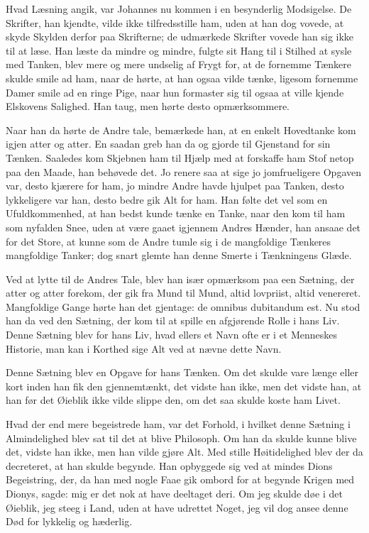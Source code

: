 \documentclass[12pt,a4paper]{article}
\begin{document}
Hvad Læsning angik, var Johannes nu kommen i en besynderlig Modsigelse. De Skrifter, han kjendte, vilde ikke tilfredsstille ham, uden at han dog vovede, at skyde Skylden derfor paa Skrifterne; de udmærkede Skrifter vovede han sig ikke til at læse. Han læste da mindre og mindre, fulgte sit Hang til i Stilhed at sysle med Tanken, blev mere og mere undselig af Frygt for, at de fornemme Tænkere skulde smile ad ham, naar de hørte, at han ogsaa vilde tænke, ligesom fornemme Damer smile ad en ringe Pige, naar hun formaster sig til ogsaa at ville kjende Elskovens Salighed. Han taug, men hørte desto opmærksommere.

Naar han da hørte de Andre tale, bemærkede han, at en enkelt Hovedtanke kom igjen atter og atter. En saadan greb han da og gjorde til Gjenstand for sin Tænken. Saaledes kom Skjebnen ham til Hjælp med at forskaffe ham Stof netop paa den Maade, han behøvede det. Jo renere saa at sige jo jomfrueligere Opgaven var, desto kjærere for ham, jo mindre Andre havde hjulpet paa Tanken, desto lykkeligere var han, desto bedre gik Alt for ham. Han følte det vel som en Ufuldkommenhed, at han bedst kunde tænke en Tanke, naar den kom til ham som nyfalden Snee, uden at være gaaet igjennem Andres Hænder, han ansaae det for det Store, at kunne som de Andre tumle sig i de mangfoldige Tænkeres mangfoldige Tanker; dog snart glemte han denne Smerte i Tænkningens Glæde.

Ved at lytte til de Andres Tale, blev han især opmærksom paa een Sætning, der atter og atter forekom, der gik fra Mund til Mund, altid lovpriist, altid venereret. Mangfoldige Gange hørte han det gjentage: de omnibus dubitandum est. Nu stod han da ved den Sætning, der kom til at spille en afgjørende Rolle i hans Liv. Denne Sætning blev for hans Liv, hvad ellers et Navn ofte er i et Menneskes Historie, man kan i Korthed sige Alt ved at nævne dette Navn.

Denne Sætning blev en Opgave for hans Tænken. Om det skulde vare længe eller kort inden han fik den gjennemtænkt, det vidste han ikke, men det vidste han, at han før det Øieblik ikke vilde slippe den, om det saa skulde koste ham Livet.

Hvad der end mere begeistrede ham, var det Forhold, i hvilket denne Sætning i Almindelighed blev sat til det at blive Philosoph. Om han da skulde kunne blive det, vidste han ikke, men han vilde gjøre Alt. Med stille Høitidelighed blev der da decreteret, at han skulde begynde. Han opbyggede sig ved at mindes Dions Begeistring, der, da han med nogle Faae gik ombord for at begynde Krigen med Dionys, sagde: mig er det nok at have deeltaget deri. Om jeg skulde døe i det Øieblik, jeg steeg i Land, uden at have udrettet Noget, jeg vil dog ansee denne Død for lykkelig og hæderlig.
\end{document}
